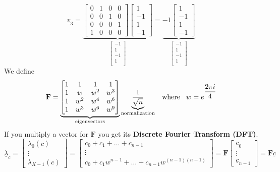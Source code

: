 \[
    \underline{v}_3 = 
    \underbrace{
    \begin{bmatrix}
        0 & 1 & 0 & 0\\
        0 & 0 & 1 & 0\\
        0 & 0 & 0 & 1\\
        1 & 0 & 0 & 0
    \end{bmatrix}   
    \begin{bmatrix}
        1\\
        -1\\
        1\\
        -1
    \end{bmatrix}}_{\begin{bmatrix}
        -1\\
        1\\
        -1\\
        1\\
    \end{bmatrix}}
    = \underbrace{-1
    \begin{bmatrix}
        1\\
        -1\\
        1\\
        -1
    \end{bmatrix}}_{\begin{bmatrix}
        -1\\
        1\\
        -1\\
        1\\
    \end{bmatrix}}
\]
We define 
\[
    \mathbf{F} = \underbrace{\begin{bmatrix}
        1 & 1 & 1 & 1\\
        1 & w & w^2 & w^3\\
        1 & w^2 & w^4 & w^6\\
        1 & w^3 & w^6 & w^9
    \end{bmatrix}}_{\text{eigenvectors}}    
    \underbrace{\dfrac{1}{\sqrt{n}}}_{\text{normalization}} \hspace{0.3cm} \text{where} \hspace{0.3cm} w = e^{\dfrac{2\pi i}{4}}
\]
If you multiply a vector for $\mathbf{F}$ you get its \textbf{Discrete Fourier Transform (DFT)}.
\[
    \underline{\lambda}_c = \begin{bmatrix}
        \lambda_0(c)\\
        \vdots\\
        \lambda_{K-1}(c)
    \end{bmatrix}    
    = 
    \begin{bmatrix}
        c_0 + c_1 + \dots + c_{n-1}\\
        \vdots\\
        c_0 + c_1w^{n-1} + \dots + c_{n-1}w^{(n-1)(n-1)}
    \end{bmatrix}
    =
    \mathbf{F} \begin{bmatrix}
        \underline{c}_0\\
        \vdots\\
        \underline{c}_{n-1}
    \end{bmatrix}
    = \mathbf{F}\underline{c}
\]
